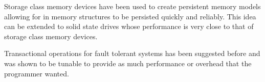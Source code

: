 \documentclass[letterpaper,12pt]{article}
\begin{document}
Storage class memory devices have been used to create persistent
memory models allowing for in memory structures to be persisted
quickly and reliably\cite{Mnemosyne}. This idea can be extended to
solid state drives whose performance is very close to that of storage
class memory devices.

Transactional operations for fault tolerant systems has been suggested
before and was shown to be tunable to provide as much performance or
overhead that the programmer wanted\cite{FaulTM}.




\end{document}
